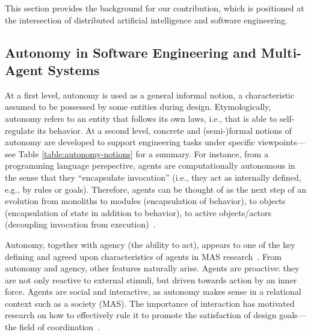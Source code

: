 \documentclass[jsan,article,accept,moreauthors,pdftex]{Definitions/mdpi}
\begin{document}
This section provides the background for our contribution, 
 which is positioned at the intersection 
 of distributed artificial intelligence 
 and software engineering.

\subsection{Autonomy in Software Engineering and Multi-Agent Systems}
\label{background-autonomy}

At a first level, autonomy is used as a general informal notion, a characteristic 
 assumed to be possessed by some entities during design.
%
Etymologically, autonomy refers to an entity that follows its own laws, i.e., that is able to self-regulate its behavior.
%
At a second level, concrete and (semi-)formal notions of autonomy are developed to support engineering tasks under specific viewpoints---see Table \ref{table:autonomy-notions} for a summary.
%
For instance, from a programming language perspective, 
 agents are computationally autonomous in the sense that they ``encapsulate invocation'' (i.e., they act as internally defined, e.g., by rules or goals). Therefore, agents can be thought of as the next step of an evolution from monoliths to modules (encapsulation of behavior), to objects
(encapsulation of state in addition to behavior), to active objects/actors
(decoupling invocation from execution)~\cite{odell2002-objects-and-agents}.

Autonomy, together with {agency} (the ability to act), appears to one of the key defining and agreed upon characteristics of agents in MAS research~\cite{franklin1996agent}.
%
From autonomy and agency, other features naturally arise.
%
Agents are {proactive}: they are not only reactive to external stimuli, 
 but driven towards action by an inner force.
%
Agents are {social} and {interactive},
 as autonomy makes sense in a relational context such as a society (MAS).
%
The importance of interaction has motivated research 
 on how to effectively rule it to promote 
 the satisfaction of design goals---the field of {coordination}~\cite{malone1994interdisciplinary}.
\end{document}
